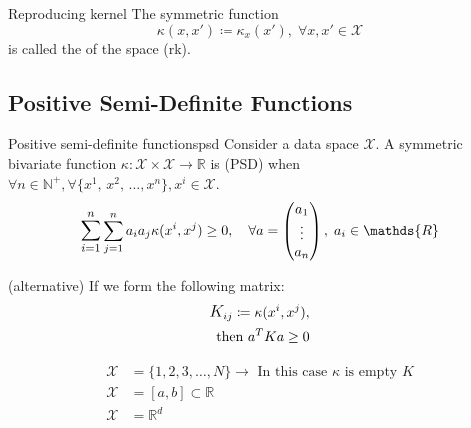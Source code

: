 \begin{definition}{Reproducing kernel}{}
	The symmetric function
	\begin{equation*}
		\kappa(x, x') \coloneqq \kappa_x(x'),\; \forall x, x' \in \mathcal{X}
	\end{equation*}
	is called the  of the space (rk).
\end{definition}

\subsection{Positive Semi-Definite Functions}

\begin{definition}{Positive semi-definite functions}{psd}
	Consider a data space $\mathcal{X}$. A symmetric bivariate function
	$\kappa: \mathcal{X} \times \mathcal{X} \to \mathds{R}$ is
	 (PSD) when
	$\forall n \in \mathds{N}^+, \forall \{x^1,\, x^2,\,\dots, x^n\},
		x^i \in \mathcal{X}$.
	\begin{align*}
		\mathlarger{\sum_{i=1}^n} \sum_{j=1}^n  a_i a_j \kappa(x^i, x^j) \geq 0,\quad
		\forall a=\begin{pmatrix} a_1 \\ \vdots \\ a_n \end{pmatrix},\; a_i \in \mathds{R}
	\end{align*}

	\tcblower

	(alternative) If we form the following matrix:
	\begin{align*}
		\mathlarger{K}_{ij} \coloneqq \kappa(x^i, x^j),\\ \text{ then } a^TKa \geq 0
	\end{align*}
\end{definition}

\begin{example}{}{}
	\begin{align*}
		\mathcal{X} & = \{1, 2, 3, \dots, N \} \rightarrow{}
		\text{ In this case } \kappa \text{ is empty } K     \\
		\mathcal{X} & = [a,b] \subset \mathds{R}             \\
		\mathcal{X} & = \mathds{R}^d
	\end{align*}
\end{example}

